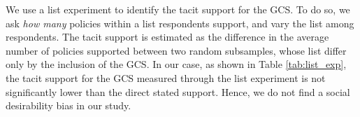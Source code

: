 
We use a list experiment to identify the tacit support for the GCS. To do so, we ask \textit{how many} policies within a list respondents support, and vary the list among respondents. The tacit support is estimated as the difference in the average number of policies supported between two random subsamples, whose list differ only by the inclusion of the GCS.\cite{hainmueller_causal_2014} %
In our case, as shown in Table \ref{tab:list_exp}, the tacit support for the GCS measured through the list experiment is not significantly lower than the direct stated support. %
Hence, we do not find a social desirability bias in our study.

